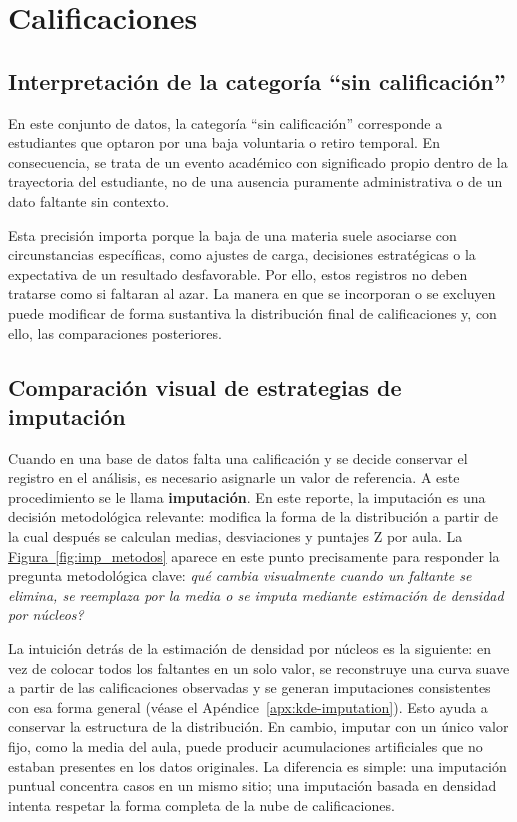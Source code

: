 \documentclass[10pt,letterpaper]{article} %
\numberwithin{figure}{subsection}
\let\oldsection\section
\renewcommand{\section}{\clearpage\oldsection}
\begin{document}
\FloatBarrier
\section{Calificaciones}

\subsection{Interpretación de la categoría ``sin calificación''}
En este conjunto de datos, la categoría ``sin calificación'' corresponde a estudiantes que optaron por una baja voluntaria o retiro temporal. En consecuencia, se trata de un evento académico con significado propio dentro de la trayectoria del estudiante, no de una ausencia puramente administrativa o de un dato faltante sin contexto.

Esta precisión importa porque la baja de una materia suele asociarse con circunstancias específicas, como ajustes de carga, decisiones estratégicas o la expectativa de un resultado desfavorable. Por ello, estos registros no deben tratarse como si faltaran al azar. La manera en que se incorporan o se excluyen puede modificar de forma sustantiva la distribución final de calificaciones y, con ello, las comparaciones posteriores.

\subsection{Comparación visual de estrategias de imputación}
Cuando en una base de datos falta una calificación y se decide conservar el registro en el análisis, es necesario asignarle un valor de referencia. A este procedimiento se le llama \textbf{imputación}. En este reporte, la imputación es una decisión metodológica relevante: modifica la forma de la distribución a partir de la cual después se calculan medias, desviaciones y puntajes Z por aula. La \hyperref[fig:imp_metodos]{Figura~\ref{fig:imp_metodos}} aparece en este punto precisamente para responder la pregunta metodológica clave: \emph{qué cambia visualmente cuando un faltante se elimina, se reemplaza por la media o se imputa mediante estimación de densidad por núcleos?}

La intuición detrás de la estimación de densidad por núcleos es la siguiente: en vez de colocar todos los faltantes en un solo valor, se reconstruye una curva suave a partir de las calificaciones observadas y se generan imputaciones consistentes con esa forma general (véase el Apéndice~\ref{apx:kde-imputation}). Esto ayuda a conservar la estructura de la distribución. En cambio, imputar con un único valor fijo, como la media del aula, puede producir acumulaciones artificiales que no estaban presentes en los datos originales. La diferencia es simple: una imputación puntual concentra casos en un mismo sitio; una imputación basada en densidad intenta respetar la forma completa de la nube de calificaciones.
\end{document}
